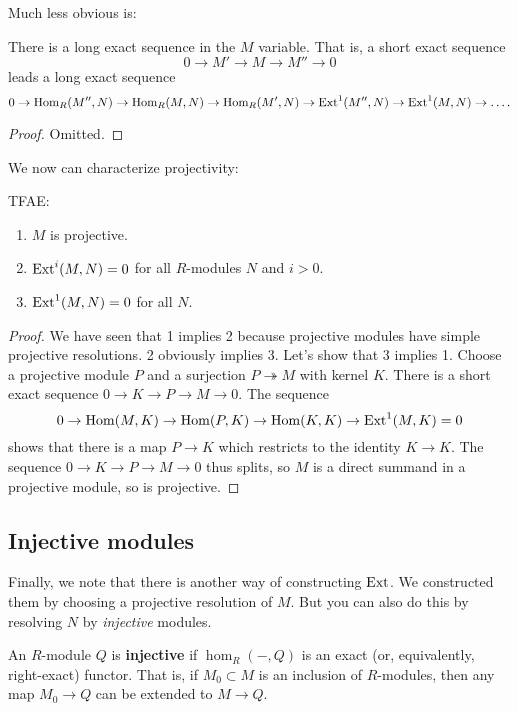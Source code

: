 Much less obvious is:

\begin{proposition} 
There is a long exact sequence in the $M$ variable. That is, a
short exact
sequence
\[ 0 \to M' \to M \to M'' \to 0  \]
leads a long exact sequence
\[ 0 \to \operatorname{Hom}_R(M'', N) \to \operatorname{Hom}_R(M,N) \to \operatorname{Hom}_R(M', N) \to
\mathrm{Ext}^1(M'', N)
\to \mathrm{Ext}^1(M, N) \to \dots.  \]
\end{proposition} 
\begin{proof} 
Omitted.
\end{proof} 

We now can characterize projectivity:
\begin{corollary} 
TFAE:
\begin{enumerate}
\item $M$ is projective. 
\item $\mathrm{Ext}^i(M,N) = 0$ for all $R$-modules $N$ and $i>0$.
\item  $\mathrm{Ext}^1(M,N)=0$ for all $N$.
\end{enumerate}
\end{corollary} 
\begin{proof} 
We have seen that 1 implies 2 because projective modules have
simple projective
resolutions. 2 obviously implies 3. Let's show that 3 implies 1.
Choose a
projective module $P$ and a surjection $P \twoheadrightarrow M$
with kernel
$K$. There is a short exact sequence $0 \to K \to P \to M \to
0$. The sequence
\[ 0 \to \operatorname{Hom}(M,K) \to \operatorname{Hom}(P,K) \to \operatorname{Hom}(K,K) \to \mathrm{Ext}^1(M,K)=0
\]
shows that there is a map $P \to K$ which restricts to the
identity $K \to K$.
The sequence $0 \to K \to P \to M \to 0$ thus splits, so $M$ is
a direct
summand in a projective module, so is projective.
\end{proof} 

\subsection{Injective modules}

Finally, we note that there is another way of constructing
$\mathrm{Ext}$. We
constructed them by choosing a projective resolution of $M$. But
you can also
do this by resolving $N$ by \emph{injective} modules. 
\begin{definition} 
An $R$-module $Q$ is \textbf{injective} if $\hom_R(-,Q)$ is an
exact (or,
equivalently, right-exact) functor. That is, if $M_0 \subset M$
is an inclusion
of $R$-modules, then any map $M_0 \to Q$ can be extended to $M
\to Q$.
\end{definition} 


